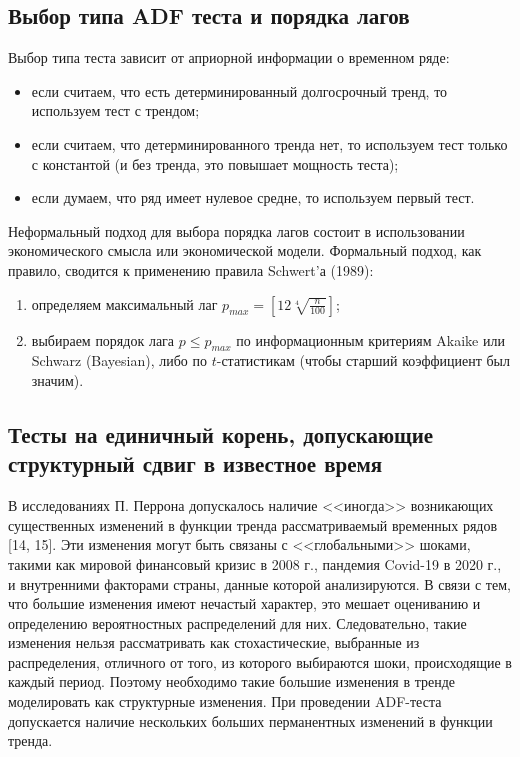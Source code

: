\documentclass[a4paper, 14pt]{extreport}
\numberwithin{equation}{subsection}
\renewcommand{\leq}{\leqslant}
\numberwithin{equation}{section}
\begin{document}
	\subsection{Выбор типа ADF теста и порядка лагов}
	Выбор типа теста зависит от априорной информации о временном ряде:
	\begin{itemize}
		\item если считаем, что есть детерминированный долгосрочный тренд, то используем тест с трендом;
		\item если считаем, что детерминированного тренда нет, то используем тест только с константой (и без тренда, это повышает мощность теста);
		\item если думаем, что ряд имеет нулевое средне, то используем первый тест.
	\end{itemize}
	
	Неформальный подход для выбора порядка лагов состоит в использовании экономического смысла или экономической модели. Формальный подход, как правило, сводится к применению правила Schwert'а (1989):
	\begin{enumerate}
		\item определяем максимальный лаг $p_{max}=[12\sqrt[4]{\frac{n}{100}}]$;
		\item выбираем порядок лага $p\leq p_{max}$ по информационным критериям Akaike или Schwarz (Bayesian), либо по $t$-статистикам (чтобы старший коэффициент был значим).
	\end{enumerate}
	\subsection{Тесты на единичный корень, допускающие структурный сдвиг в известное время}
	\label{sbs:bpur}
	В исследованиях П. Перрона допускалось наличие <<иногда>> возникающих существенных изменений в функции тренда рассматриваемый временных рядов [14, 15]. Эти изменения могут быть связаны с <<глобальными>> шоками, такими как мировой финансовый кризис в 2008 г., пандемия Covid-19 в 2020 г., и внутренними факторами страны, данные которой анализируются. В связи с тем, что большие изменения имеют нечастый характер, это мешает оцениванию и определению вероятностных распределений для них. Следовательно, такие изменения нельзя рассматривать как стохастические, выбранные из распределения, отличного от того, из которого выбираются шоки, происходящие в каждый период. Поэтому необходимо такие большие изменения в тренде моделировать как структурные изменения. При проведении ADF-теста допускается наличие нескольких больших перманентных изменений в функции тренда.
	
\end{document}
